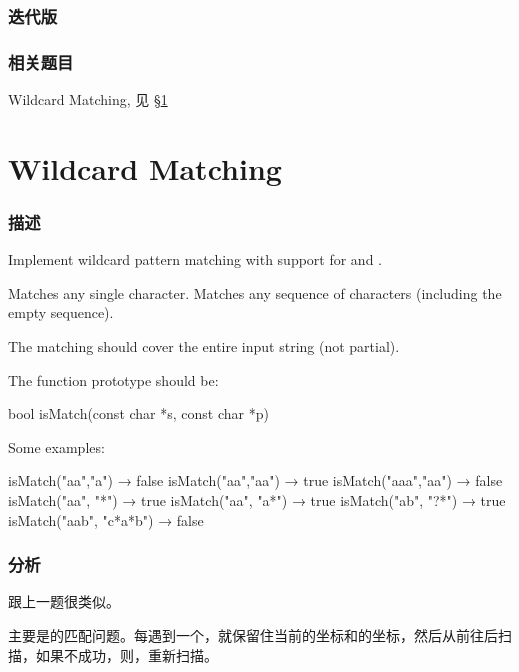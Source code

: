 \subsubsection{迭代版}
\begin{Code}

\end{Code}


\subsubsection{相关题目}
\begindot
\item Wildcard Matching, 见 \S \ref{sec:wildcard-matching}
\myenddot


\section{Wildcard Matching} %
\label{sec:wildcard-matching}


\subsubsection{描述}
Implement wildcard pattern matching with support for  and .

 Matches any single character.
 Matches any sequence of characters (including the empty sequence).

The matching should cover the entire input string (not partial).

The function prototype should be:
\begin{Code}
bool isMatch(const char *s, const char *p)
\end{Code}

Some examples:
\begin{Code}
isMatch("aa","a") → false
isMatch("aa","aa") → true
isMatch("aaa","aa") → false
isMatch("aa", "*") → true
isMatch("aa", "a*") → true
isMatch("ab", "?*") → true
isMatch("aab", "c*a*b") → false
\end{Code}


\subsubsection{分析}
跟上一题很类似。

主要是的匹配问题。每遇到一个，就保留住当前的坐标和的坐标，然后从前往后扫描，如果不成功，则，重新扫描。



